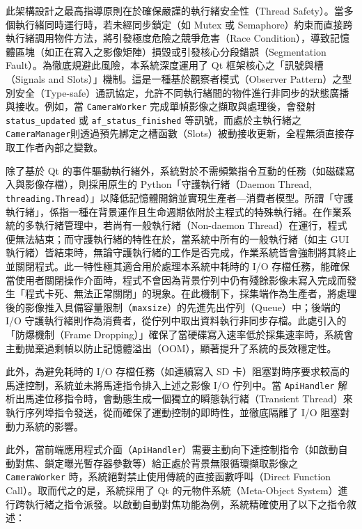 此架構設計之最高指導原則在於確保嚴謹的執行緒安全性（Thread Safety）。當多個執行緒同時運行時，若未經同步鎖定（如 Mutex 或 Semaphore）約束而直接跨執行緒調用物件方法，將引發極度危險之競爭危害（Race Condition），導致記憶體區塊（如正在寫入之影像矩陣）損毀或引發核心分段錯誤（Segmentation Fault）。為徹底規避此風險，本系統深度運用了 Qt 框架核心之「訊號與槽（Signals and Slots）」機制。這是一種基於觀察者模式（Observer Pattern）之型別安全（Type-safe）通訊協定，允許不同執行緒間的物件進行非同步的狀態廣播與接收。例如，當 \texttt{CameraWorker} 完成單幀影像之擷取與處理後，會發射 \texttt{status\_updated} 或 \texttt{af\_status\_finished} 等訊號，而處於主執行緒之 \texttt{CameraManager}則透過預先綁定之槽函數（Slots）被動接收更新，全程無須直接存取工作者內部之變數。

除了基於 Qt 的事件驅動執行緒外，系統對於不需頻繁指令互動的任務（如磁碟寫入與影像存檔），則採用原生的 Python「守護執行緒（Daemon Thread, \texttt{threading.Thread}）」以降低記憶體開銷並實現生產者—消費者模型。所謂「守護執行緒」，係指一種在背景運作且生命週期依附於主程式的特殊執行緒。在作業系統的多執行緒管理中，若尚有一般執行緒（Non-daemon Thread）在運行，程式便無法結束；而守護執行緒的特性在於，當系統中所有的一般執行緒（如主 GUI 執行緒）皆結束時，無論守護執行緒的工作是否完成，作業系統皆會強制將其終止並關閉程式。此一特性極其適合用於處理本系統中耗時的 I/O 存檔任務，能確保當使用者關閉操作介面時，程式不會因為背景佇列中仍有殘餘影像未寫入完成而發生「程式卡死、無法正常關閉」的現象。在此機制下，採集端作為生產者，將處理後的影像推入具備容量限制（\texttt{maxsize}）的先進先出佇列（Queue）中；後端的 I/O 守護執行緒則作為消費者，從佇列中取出資料執行非同步存檔。此處引入的「防爆機制（Frame Dropping）」確保了當硬碟寫入速率低於採集速率時，系統會主動拋棄過剩幀以防止記憶體溢出（OOM），顯著提升了系統的長效穩定性。

此外，為避免耗時的 I/O 存檔任務（如連續寫入 SD 卡）阻塞對時序要求較高的馬達控制，系統並未將馬達指令排入上述之影像 I/O 佇列中。當 \texttt{ApiHandler} 解析出馬達位移指令時，會動態生成一個獨立的瞬態執行緒（Transient Thread）來執行序列埠指令發送，從而確保了運動控制的即時性，並徹底隔離了 I/O 阻塞對動力系統的影響。

此外，當前端應用程式介面（\texttt{ApiHandler}）需要主動向下達控制指令（如啟動自動對焦、鎖定曝光暫存器參數等）給正處於背景無限循環擷取影像之 \texttt{CameraWorker} 時，系統絕對禁止使用傳統的直接函數呼叫（Direct Function Call）。取而代之的是，系統採用了 Qt 的元物件系統（Meta-Object System）進行跨執行緒之指令派發。以啟動自動對焦功能為例，系統精確使用了以下之指令敘述：

